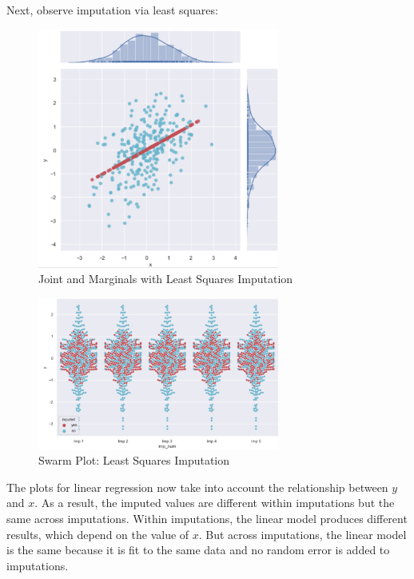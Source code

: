 \documentclass[12pt,oneside]{chicagocapstone}
\begin{document}
Next, observe imputation via least squares:
\begin{figure}

{\centering \includegraphics[width=300px]{figure/multi-lm} 

}

\caption{Joint and Marginals with Least Squares Imputation}\label{fig:multi-lm}
\end{figure}
\begin{figure}

{\centering \includegraphics[width=300px]{figure/swarm-lm} 

}

\caption{Swarm Plot: Least Squares Imputation}\label{fig:swarm-lm}
\end{figure}
The plots for linear regression now take into account the relationship
between \(y\) and \(x\). As a result, the imputed values are different
within imputations but the same across imputations. Within imputations,
the linear model produces different results, which depend on the value
of \(x\). But across imputations, the linear model is the same because
it is fit to the same data and no random error is added to imputations.
\end{document}
